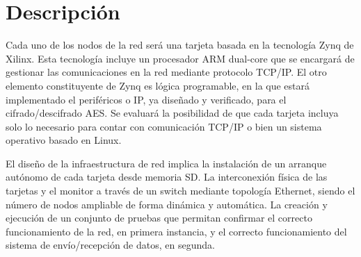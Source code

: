 \section{Descripción}
Cada uno de los nodos de la red será una tarjeta basada en la tecnología Zynq de Xilinx. Esta tecnología incluye un procesador ARM dual-core que se encargará de gestionar las
comunicaciones en la red mediante protocolo TCP/IP. El otro elemento constituyente de Zynq es lógica programable, en la que estará implementado el periféricos o IP, ya diseñado y
verificado, para el cifrado/descifrado AES. Se evaluará la posibilidad de que cada tarjeta incluya solo lo necesario para contar con comunicación TCP/IP o bien un sistema operativo
basado en Linux.

El diseño de la infraestructura de red implica la instalación de un arranque autónomo de cada tarjeta desde memoria SD. La interconexión física de las tarjetas y el monitor a través de
un switch mediante topología Ethernet, siendo el número de nodos ampliable de forma dinámica y automática. La creación y ejecución de un conjunto de pruebas que permitan confirmar
el correcto funcionamiento de la red, en primera instancia, y el correcto funcionamiento del sistema de envío/recepción de datos, en segunda.